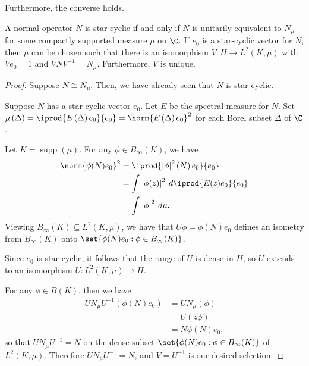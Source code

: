 \documentclass[10pt]{mypackage}
\begin{document}
Furthermore, the converse holds.
\begin{theorem}
  A normal operator $N$ is star-cyclic if and only if $N$ is unitarily equivalent to $N_{\mu}$ for some compactly supported measure $\mu$ on $\C$. If $e_0$ is a star-cyclic vector for $N$, then $\mu$ can be chosen such that there is an isomorphism $V\colon H\rightarrow L^2\left( K, \mu \right)$ with $Ve_0 = 1$ and $VNV^{-1} = N_{\mu}$. Furthermore, $V$ is unique.
\end{theorem}
\begin{proof}
  Suppose $N\cong N_{\mu}$. Then, we have already seen that $N$ is star-cyclic.

  Suppose $N$ has a star-cyclic vector $e_0$. Let $E$ be the spectral measure for $N$. Set $\mu\left( \Delta \right) = \iprod{E\left( \Delta \right)e_0}{e_0} = \norm{E\left( \Delta \right)e_0}^2$ for each Borel subset $\Delta$ of $\C$.

  Let $K = \operatorname{supp}\left( \mu \right)$. For any $\phi\in B_{\infty}(K)$, we have
  \begin{align*}
    \norm{\phi(N)e_0}^2 &= \iprod{\left\vert \phi \right\vert^2\left( N \right)e_0}{e_0}\\
                        &= \int_{}^{} \left\vert \phi(z) \right\vert^2\:d \iprod{E(z)e_0}{e_0}\\
                        &= \int_{}^{} \left\vert \phi \right\vert^2\:d\mu.
  \end{align*}
  Viewing $B_{\infty}(K)\subseteq L^2\left( K, \mu \right)$, we have that $U\phi = \phi(N)e_0$ defines an isometry from $B_{\infty}(K)$ onto $\set{\phi(N)e_0 : \phi\in B_{\infty}(K)}$.

  Since $e_0$ is star-cyclic, it follows that the range of $U$ is dense in $H$, so $U$ extends to an isomorphism $U\colon L^2\left( K, \mu \right)\rightarrow H$.

  For any $\phi\in B(K)$, then we have
  \begin{align*}
    UN_{\mu}U^{-1} \left( \phi(N)e_0 \right) &= UN_{\mu}\left( \phi \right)\\
                                             &= U\left( z\phi \right)\\
                                             &= N\phi(N)e_0,
  \end{align*}
  so that $UN_{\mu}U^{-1} = N$ on the dense subset $\set{\phi(N)e_0 : \phi\in B_{\infty}(K)}$ of $L^2\left( K, \mu \right)$. Therefore $UN_{\mu}U^{-1} = N$, and $V = U^{-1}$ is our desired selection.
\end{proof}
\end{document}
